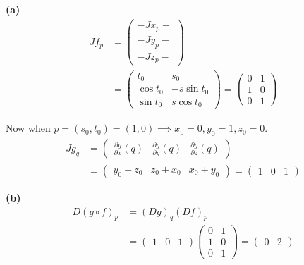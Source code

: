 \documentclass[a4paper, 12pt]{article}
\begin{document}
\begin{solution}
    \textbf{(a)}
    \begin{align*}
        Jf_p & = \begin{pmatrix}
                     - Jx_p - \\
                     - Jy_p - \\
                     - Jz_p -
                 \end{pmatrix}                 \\
             & = \begin{pmatrix}
                     t_0      & s_0         \\
                     \cos t_0 & -s \sin t_0 \\
                     \sin t_0 & s \cos t_0
                 \end{pmatrix} = \begin{pmatrix}
                                     0 & 1 \\
                                     1 & 0 \\
                                     0 & 1
                                 \end{pmatrix}
    \end{align*}

    Now when $p = (s_0, t_0) = (1, 0) \implies x_0 = 0, y_0 = 1, z_0 = 0 $.
    \begin{align*}
        Jg_q & = \begin{pmatrix}
                     \frac{\partial g}{\partial x}(q) &
                     \frac{\partial g}{\partial y}(q) &
                     \frac{\partial g}{\partial z}(q)
                 \end{pmatrix} \\
             & = \begin{pmatrix}
                     y_0 + z_0 & z_0 + x_0 & x_0 + y_0
                 \end{pmatrix} = \begin{pmatrix}
                                     1 & 0 & 1
                                 \end{pmatrix}
    \end{align*}

    \textbf{(b)}
    \begin{align*}
        D(g \circ f)_p & = (Dg)_q (Df)_p   \\
                       & =  \begin{pmatrix}
                                1 & 0 & 1
                            \end{pmatrix}
        \begin{pmatrix}
            0 & 1 \\
            1 & 0 \\
            0 & 1
        \end{pmatrix}
        = \begin{pmatrix}
              0 & 2
          \end{pmatrix}
    \end{align*}


\end{solution}
\end{document}
